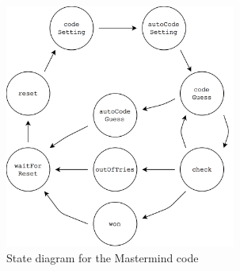 \documentclass[a4paper, 12pt]{article}
\begin{document}
\begin{figure}[H] \centering
    \includegraphics[height=8cm]{res/state_machine}
    \caption{State diagram for the Mastermind code}
\end{figure}
\end{document}
